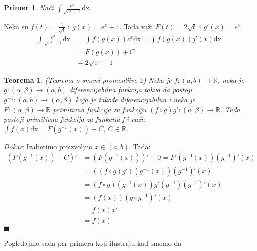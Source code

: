 \documentclass{article}
\newtheorem{teorema}{Teorema}[section]
\newtheorem{prim}{Primer}[section]
\begin{document}
\begin{primbox}
    \begin{prim}
        Naći $\int \frac{e^x}{\sqrt{e^x + 1}}\text{dx}$.
    \end{prim}
    Neka su $f(t) = \frac{1}{\sqrt{t}}$ i $g(x) = e^x+1$. Tada važi $F(t) = 2  \sqrt{t}$ i $g'(x) = e^x$.
    \begin{align*}
        \int\frac{e^x}{\sqrt{e^x + 1}}\text{dx} & = \int f(g(x))e^x\text{dx} = \int f(g(x))g'(x)\text{dx}
        \\ & = F(g(x)) + C
        \\ & = 2 \sqrt{ e^x+1}
    \end{align*}
\end{primbox}
\begin{teoremabox}
    \begin{teorema} \label{teorema_1.3}
        (Teorema o smeni promenljive 2)
        Neka je $f:(a, b) \longrightarrow \mathbb{R}$, neka je
        $g:(\alpha, \beta) \longrightarrow (a, b)$
        diferencijabilna funkcija takva da postoji
        $g^{-1}:(a,b) \longrightarrow (\alpha, \beta)$
        koja je takođe diferencijabilna i neka je \\
        $F:(\alpha, \beta) \longrightarrow \mathbb{R}$
        primitivna funkcija za funkciju
        $(f\circ g) g' : (\alpha, \beta) \longrightarrow \mathbb{R}$.
        Tada postoji primitivna funkcija za funkciju f i važi:
        $\int f(x) \text{dx} = F(g^{-1}(x)) + C,\ C \in \mathbb{R}$.
    \end{teorema}
\end{teoremabox}
\textit{Dokaz}: Izaberimo proizvoljno $x \in (a, b)$. Tada:
\begin{align*}
    (F(g^{-1}(x)) + C)' & = (F(g^{-1}(x)))' + 0 = F'(g^{-1}(x)) (g^{-1})'(x) \\
                        & = ((f\circ g) g')(g^{-1}(x)) (g^{-1})'(x)          \\
                        & = (f\circ g)(g^{-1}(x)) g'(g^{-1}) (g^{-1})'(x)    \\
                        & = (f(x)) (g \circ g^{-1})'(x)                      \\
                        & = f(x) x'                                          \\
                        & = f(x)
\end{align*}
\null\hfill $\blacksquare$\par\par
Pogledajmo sada par primera koji ilustruju kad smemo da
\end{document}
